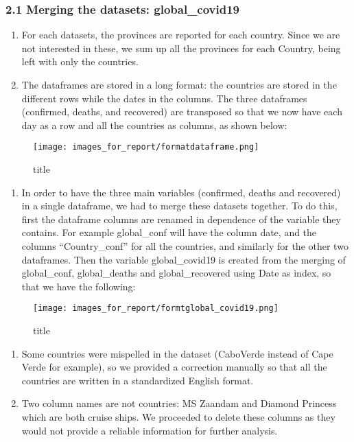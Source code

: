 \documentclass[11pt]{article}
\makeatletter
\def\maxwidth{\ifdim\Gin@nat@width>\linewidth\linewidth
    \else\Gin@nat@width\fi}
\let\Oldincludegraphics\includegraphics
\renewcommand{\includegraphics}[1]{\Oldincludegraphics[width=.8\maxwidth]{#1}}
\providecommand{\tightlist}{%
      \setlength{\itemsep}{0pt}\setlength{\parskip}{0pt}}
\makeatother
\begin{document}
\hypertarget{merging-the-datasets-global_covid19}{%
\subsubsection{2.1 Merging the datasets:
global\_covid19}\label{merging-the-datasets-global_covid19}}

\begin{enumerate}
\def\labelenumi{\arabic{enumi}.}
\item
  For each datasets, the provinces are reported for each country. Since
  we are not interested in these, we sum up all the provinces for each
  Country, being left with only the countries.
\item
  The dataframes are stored in a long format: the countries are stored
  in the different rows while the dates in the columns. The three
  dataframes (confirmed, deaths, and recovered) are transposed so that
  we now have each day as a row and all the countries as columns, as
  shown below:
\end{enumerate}

\begin{figure}
\centering
\texttt{[image: images\_for\_report/formatdataframe.png]}
\caption{title}
\end{figure}

\begin{enumerate}
\def\labelenumi{\arabic{enumi}.}
\setcounter{enumi}{2}
\tightlist
\item
  In order to have the three main variables (confirmed, deaths and
  recovered) in a single dataframe, we had to merge these datasets
  together. To do this, first the dataframe columns are renamed in
  dependence of the variable they contains. For example global\_conf
  will have the column date, and the columns ``Country\_conf'' for all
  the countries, and similarly for the other two dataframes. Then the
  variable global\_covid19 is created from the merging of global\_conf,
  global\_deaths and global\_recovered using Date as index, so that we
  have the following:
\end{enumerate}

\begin{figure}
\centering
\texttt{[image: images\_for\_report/formtglobal\_covid19.png]}
\caption{title}
\end{figure}

\begin{enumerate}
\def\labelenumi{\arabic{enumi}.}
\setcounter{enumi}{3}
\item
  Some countries were mispelled in the dataset (CaboVerde instead of
  Cape Verde for example), so we provided a correction manually so that
  all the countries are written in a standardized English format.
\item
  Two column names are not countries: MS Zaandam and Diamond Princess
  which are both cruise ships. We proceeded to delete these columns as
  they would not provide a reliable information for further analysis.
\end{enumerate}
\end{document}
